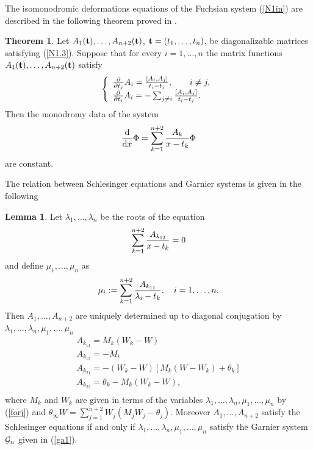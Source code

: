 \documentclass[12pt]{article}
\theoremstyle{definition}
\theoremstyle{theorem}
\newtheorem{lm}[df]{Lemma}
\newtheorem{thm}[df]{Theorem}
\begin{document}
The isomonodromic deformations equations of the Fuchsian system (\ref{N1in})
are described in the following theorem proved in \cite{Sch}.

\begin{thm}
Let $A_1({\bf t}),\dots,A_{n+2}({\bf t})$, ${\bf t}=(t_1,\dots,t_{n})$, 
be diagonalizable matrices satisfying (\ref{N1.3}). Suppose that for 
every $i=1,\dots,n$ the matrix functions $A_1({\bf t}),\dots,A_{n+2}({\bf t})$
satisfy
\begin{equation}
\left\{\begin{array}{l}
{\partial\over\partial t_j} {A}_i= 
{[ {A}_i, {A}_j]\over t_i-t_j},\qquad i\neq j,\\
{\partial\over\partial t_i} {A}_i= 
-\sum_{j\neq i}{[ {A}_i, {A}_j]\over t_i-t_j}.\\
\end{array}\right. 
\label{schl}
\end{equation}
Then the monodromy data of 
the system  
$$
{{\rm d}\over{\rm d} x} \Phi
=\sum_{k=1}^{n+2} {{A}_k\over x-t_k}\Phi 
$$
are constant.
\end{thm}

The relation between Schlesinger equations and Garnier systems is given in 
the following

\begin{lm}\cite{IKSY}
Let $\lambda_1,\dots,\lambda_n$ be the roots of the equation
$$
\sum_{k=1}^{n+2} {{A}_{k_{12}}\over x-t_k}=0
$$ 
and define $\mu_1,\dots,\mu_n$ as
$$
\mu_i:=\sum_{k=1}^{n+2} {{A}_{k_{11}}\over \lambda_i-t_k},\quad i=1,\dots,n.
$$ 
Then $A_1,\dots,A_{n+2}$ are uniquely determined up to diagonal conjugation
by $\lambda_1,\dots,\lambda_n,\mu_1,\dots,\mu_n$ 
\begin{equation}
\begin{array}{l}
A_{k_{11}}= M_k(W_k-W)\\
A_{k_{12}}=-M_i \\
A_{k_{21}}= -(W_k-W)[ M_k(W-W_k)+\theta_k]\\
A_{k_{22}}= \theta_k-M_k(W_k-W),\\
\end{array}
\label{fA}\end{equation}
where $M_k$ and $W_k$ are given in terms of the 
variables $\lambda_1,\dots,\lambda_n,\mu_1,\dots,\mu_n$ by (\ref{forj}) and
$\theta_\infty W=\sum_{j=1}^{n+2}W_j(M_j W_j-\theta_j)$. Moreover 
$A_1,\dots,A_{n+2}$ satisfy the Schlesinger equations if and only if 
$\lambda_1,\dots,\lambda_n,\mu_1,\dots,\mu_n$ satisfy the Garnier 
system ${\cal G}_n$ given in (\ref{ga1}).
\end{lm}
\end{document}
